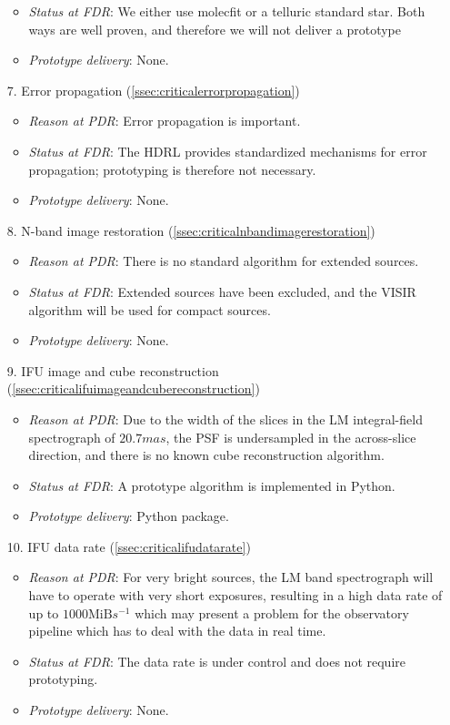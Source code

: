 \begin{enumerate}
\begin{itemize}
        \item \textit{Status at FDR}: We either use molecfit or a telluric standard star. Both ways are well proven, and therefore we will not deliver a prototype
        \item \textit{Prototype delivery}: None.
    \end{itemize}
    \item[7.] Error propagation (\ref{ssec:criticalerrorpropagation})
    \begin{itemize}
        \item \textit{Reason at PDR}: Error propagation is important.
        \item \textit{Status at FDR}: The \ac{HDRL} provides standardized mechanisms for error propagation; prototyping is therefore not necessary.
        \item \textit{Prototype delivery}: None.
    \end{itemize}
    \item[8.] N-band image restoration (\ref{ssec:criticalnbandimagerestoration})
    \begin{itemize}
        \item \textit{Reason at PDR}: There is no standard algorithm for extended sources.
        \item \textit{Status at FDR}: Extended sources have been excluded, and the VISIR algorithm will be used for compact sources.
        \item \textit{Prototype delivery}: None.
    \end{itemize}
    \item[9.] IFU image and cube reconstruction (\ref{ssec:criticalifuimageandcubereconstruction})
    \begin{itemize}
        \item \textit{Reason at PDR}: Due to the width of the slices in the LM integral-field spectrograph of $20.7 mas$, the PSF is undersampled in the across-slice direction, and there is no known cube reconstruction algorithm.
        \item \textit{Status at FDR}: A prototype algorithm is implemented in Python.
        \item \textit{Prototype delivery}: Python package.
    \end{itemize}
    \item[10.] IFU data rate (\ref{ssec:criticalifudatarate})
    \begin{itemize}
        \item \textit{Reason at PDR}: For very bright sources, the LM band spectrograph will have to operate with very short exposures, resulting in a high data rate of up to $1000 \mathrm{MiB}s^{-1}$ which may present a problem for the observatory pipeline which has to deal with the data in real time.
        \item \textit{Status at FDR}: The data rate is under control and does not require prototyping.
        \item \textit{Prototype delivery}: None.
    \end{itemize}
\end{enumerate}

